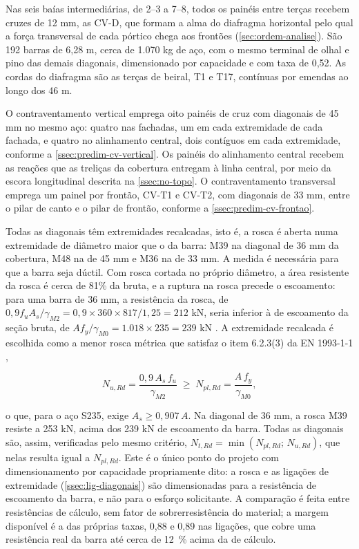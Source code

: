 Nas seis baías intermediárias, de 2--3 a 7--8, todos os painéis entre terças
recebem cruzes de 12 mm, as CV-D, que formam a alma do diafragma horizontal pelo
qual a força transversal de cada pórtico chega aos frontões
(\autoref{sec:ordem-analise}). São 192 barras de 6,28 m, cerca de 1.070 kg de
aço, com o mesmo terminal de olhal e pino das demais diagonais, dimensionado por
capacidade e com taxa de 0,52. As cordas do diafragma são as terças de beiral,
T1 e T17, contínuas por emendas ao longo dos 46 m.

O contraventamento vertical emprega oito painéis de cruz com diagonais de 45 mm no
mesmo aço: quatro nas fachadas, um em cada extremidade de cada fachada, e quatro
no alinhamento central, dois contíguos em cada extremidade, conforme a
\autoref{ssec:predim-cv-vertical}. Os painéis do alinhamento central recebem as
reações que as treliças da cobertura entregam à linha central, por meio da
escora longitudinal descrita na \autoref{ssec:no-topo}. O contraventamento
transversal emprega um painel por frontão, CV-T1 e CV-T2, com diagonais de
33 mm, entre o pilar de canto e o pilar de frontão, conforme a
\autoref{ssec:predim-cv-frontao}.

Todas as diagonais têm extremidades recalcadas, isto é, a rosca é aberta numa
extremidade de diâmetro maior que o da barra: M39 na diagonal de 36 mm da
cobertura, M48 na de 45 mm e M36 na de 33 mm. A medida é necessária para que a
barra seja dúctil. Com rosca cortada no próprio diâmetro, a área resistente da
rosca é cerca de 81\% da bruta, e a ruptura na rosca precede o escoamento: para
uma barra de 36 mm, a resistência da rosca, de $0{,}9 f_u A_s/\gamma_{M2} =
0{,}9 \times 360 \times 817 / 1{,}25 = 212$ kN, seria inferior à de
escoamento da seção bruta, de $A f_y/\gamma_{M0} = 1.018 \times 235 = 239$ kN
\cite{EN1993-1-8:2005}. A extremidade recalcada é escolhida como a menor rosca
métrica que satisfaz o item 6.2.3(3) da EN 1993-1-1 \cite{EN1993-1-1:2005},

\begin{equation}
    N_{u,Rd} = \frac{0{,}9\,A_s\,f_u}{\gamma_{M2}} \;\geq\;
    N_{pl,Rd} = \frac{A\,f_y}{\gamma_{M0}} ,
    \label{eq:rosca-recalcada}
\end{equation}

\noindent
o que, para o aço S235, exige $A_s \geq 0{,}907\,A$. Na diagonal de 36 mm, a
rosca M39 resiste a 253 kN, acima dos 239 kN de escoamento da barra. Todas as
diagonais são, assim, verificadas pelo mesmo critério,
$N_{t,Rd} = \min(N_{pl,Rd};\, N_{u,Rd})$, que nelas resulta igual a $N_{pl,Rd}$.
Este é o único ponto do projeto com dimensionamento por capacidade propriamente
dito: a rosca e as ligações de extremidade (\autoref{ssec:lig-diagonais}) são
dimensionadas para a resistência de escoamento da barra, e não para o esforço
solicitante. A comparação é feita entre resistências de cálculo, sem fator de
sobrerresistência do material; a margem disponível é a das próprias taxas, 0,88
e 0,89 nas ligações, que cobre uma resistência real da barra até cerca de 12~\%
acima da de cálculo.

